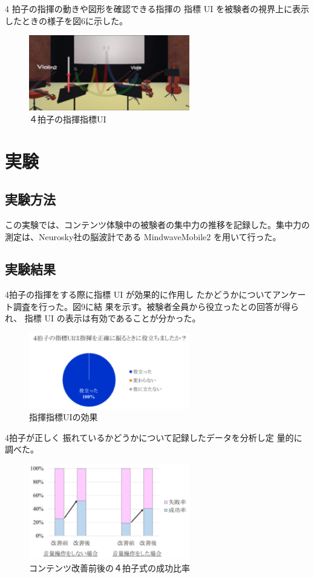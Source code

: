 \documentclass[uplatex]{jsarticle}   %
\begin{document}
   4 拍子の指揮の動きや図形を確認できる指揮の 指標 UI を被験者の視界上に表示したときの様子を図6に示した。

\begin{figure}[H]
 \centering
 \includegraphics[clip,width=7cm]{sikiUI.png}
 \caption{４拍子の指揮指標UI}\label{fig:hoge}
\end{figure}

\section{実験}
\subsection{実験方法}
この実験では、コンテンツ体験中の被験者の集中力の推移を記録した。集中力の測定は、Neurosky社の脳波計である MindwaveMobile2 を用いて行った。


\subsection{実験結果}
4拍子の指揮をする際に指標 UI が効果的に作用し たかどうかについてアンケート調査を行った。図9に結 果を示す。被験者全員から役立ったとの回答が得られ、 指標 UI の表示は有効であることが分かった。 
\begin{figure}[H]
 \centering
 \includegraphics[clip,width=7cm]{UIkouka.png}
 \caption{指揮指標UIの効果}\label{fig:hoge}
\end{figure}

4拍子が正しく 振れているかどうかについて記録したデータを分析し定 量的に調べた。

\begin{figure}[H]
 \centering
 \includegraphics[clip,width=7cm]{sippairitu.png}
 \caption{コンテンツ改善前後の４拍子式の成功比率}\label{fig:hoge}
\end{figure}
\end{document}
